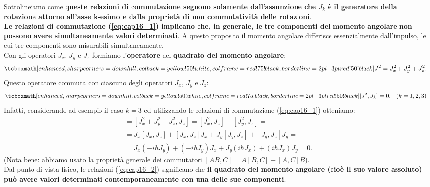 \documentclass[a4paper,12pt,oneside]{book}
\begin{document}
Sottolineiamo come \textbf{queste relazioni di commutazione seguono solamente dall'assunzione che $J_k$ è il generatore della rotazione attorno all'asse k-esimo e dalla proprietà di non commutatività delle rotazioni}.\\

\textbf{Le relazioni di commutazione (\ref{eq:cap16_1}) implicano che, in generale, le tre componenti del momento angolare non possono avere simultaneamente valori determinati}. A questo proposito il momento angolare differisce essenzialmente dall'impulso, le cui tre componenti sono misurabili simultaneamente.\\
		
Con gli operatori $J_x$, $J_y$ e $J_z$ formiamo l'\textbf{operatore} del \textbf{quadrato del momento angolare}:
	\begin{equation}
		\tcboxmath[enhanced, sharp corners=downhill, colback=yellow!50!white, colframe=red!75!black, borderline={2pt}{-3pt}{red!50!black}]{
			J^2 = J_x ^2 + J_y ^2 + J_z ^2.
			}
	\end{equation}
Questo operatore commuta con ciascuno degli operatori $J_x$, $J_y$ e $J_z$:
	\begin{equation}
		\tcboxmath[enhanced, sharp corners=downhill, colback=yellow!50!white, colframe=red!75!black, borderline={2pt}{-3pt}{red!50!black}]{
			[J^2, J_k]=0.
			} \quad (k=1,2,3)
	\label{eq:cap16_2}
	\end{equation}
Infatti, considerando ad esempio il caso $k=3$ ed utilizzando le relazioni di commutazione (\ref{eq:cap16_1}) otteniamo:
	\begin{align}
		[J^2, J_z] &= [J_x ^2+J_y^2+J_z ^2, J_z] = [J_x ^2, J_z]+[J_y ^2, J_z]= \nonumber \\
	& = J_x[J_x, J_z]+[J_x, J_z]J_x+J_y[J_y, J_z]+[J_y, J_z]J_y =  \nonumber \\
	& =  J_x (-i\hbar J_y)+ (-i\hbar J_y)J_x+ J_y (i\hbar J_x)+(i\hbar J_x)J_y =  0.  
	\end{align}
(Nota bene: abbiamo usato la proprietà generale dei commutatori $[AB,C]=A[B,C]+[A,C]B$).\\

Dal punto di vista fisico, le relazioni (\ref{eq:cap16_2}) significano che \textbf{il quadrato del momento angolare (cioè il suo valore assoluto) può avere valori determinati contemporaneamente con una delle sue componenti}.
\end{document}

